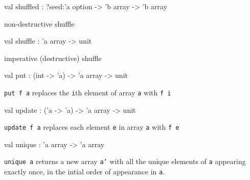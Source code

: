 \documentclass[11pt]{article}
\begin{document}
\begin{ocamldocsigend}
\begin{ocamldocdescription}
\end{ocamldocdescription}


\label{val:Util.A.shuffled}\begin{ocamldoccode}
val shuffled : ?seed:'a option -> 'b array -> 'b array
\end{ocamldoccode}
\begin{ocamldocdescription}
non-destructive shuffle


\end{ocamldocdescription}


\label{val:Util.A.shuffle}\begin{ocamldoccode}
val shuffle : 'a array -> unit
\end{ocamldoccode}
\begin{ocamldocdescription}
imperative (destructive) shuffle


\end{ocamldocdescription}


\label{val:Util.A.put}\begin{ocamldoccode}
val put : (int -> 'a) -> 'a array -> unit
\end{ocamldoccode}
\begin{ocamldocdescription}
{\tt{put f a}} replaces the {\tt{i}}th element of array {\tt{a}} with {\tt{f i}}


\end{ocamldocdescription}


\label{val:Util.A.update}\begin{ocamldoccode}
val update : ('a -> 'a) -> 'a array -> unit
\end{ocamldoccode}
\begin{ocamldocdescription}
{\tt{update f a}} replaces each element {\tt{e}} in array {\tt{a}} with {\tt{f e}}


\end{ocamldocdescription}


\label{val:Util.A.unique}\begin{ocamldoccode}
val unique : 'a array -> 'a array
\end{ocamldoccode}
\begin{ocamldocdescription}
{\tt{unique a}} returns a new array {\tt{a'}} with all the unique elements of {\tt{a}} appearing
    exactly once, in the intial order of appearance in {\tt{a}}.


\end{ocamldocdescription}



\end{ocamldocsigend}
\end{document}
